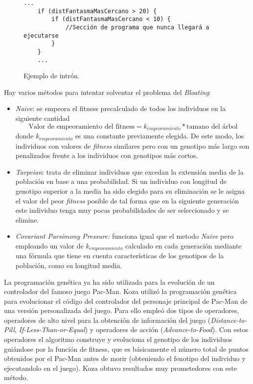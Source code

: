 \begin{figure}[H]
\begin{lstlisting}[]
    ...
    if (distFantasmaMasCercano > 20) { 
        if (distFantasmaMasCercano < 10) {
            //Sección de programa que nunca llegará a ejecutarse
        }
    }
    ...
\end{lstlisting}
	\caption{Ejemplo de intrón.}
\end{figure}

Hay varios métodos para intentar solventar el problema del \textit{Bloating}:
\begin{itemize}
\item \textit{Naive}: se empeora el fitness precalculado de todos los individuos en la siguiente cantidad
\begin{equation*}
\textrm{Valor de empeoramiento del fitness} = k_{empeoramiento} * \textrm{tamano del árbol}
\end{equation*}
donde $k_{empeoramiento}$ es una constante previamente elegida. De este modo, los individuos con valores de \textit{fitness} similares pero con un genotipo más largo son penalizados frente a los individuos con genotipos más cortos.

\item \textit{Tarpeian}: trata de eliminar individuos que excedan la extensión media de la población en base a una probabilidad. Si un individuo con longitud de genotipo superior a la media ha sido elegido para su eliminación se le asigna el valor del peor \textit{fitness} posible de tal forma que en la siguiente generación este individuo tenga muy pocas probabilidades de ser seleccionado y se elimine.

\item \textit{Covariant Parsimony Pressure:} \cite{poli2008covariant} funciona igual que el metodo \textit{Naive} pero empleando un valor de $k_{empeoramiento}$ calculado en cada generación mediante una fórmula que tiene en cuenta características de los genotipos de la población, como su longitud media.
\end{itemize}

La programación genética ya ha sido utilizada para la evolución de un controlador del famoso juego Pac-Man. Koza \cite{koza1992genetic} utilizó la programación genética para evolucionar el código del controlador del personaje principal de Pac-Man de una versión personalizada del juego. Para ello empleó dos tipos de operadores, operadores de alto nivel para la obtención de información del juego (\textit{Distance-to-Pill},
\textit{If-Less-Than-or-Equal}) y operadores de acción (\textit{Advance-to-Food}). Con estos operadores el algoritmo construye y evoluciona el genotipo de los individuos guiándose por la función de fitness, que es básicamente el número total de puntos obtenidos por el Pac-Man antes de morir (obteniendo el fenotipo del individuo y ejecutandolo en el juego). Koza obtuvo resultados muy prometedores con este método.

